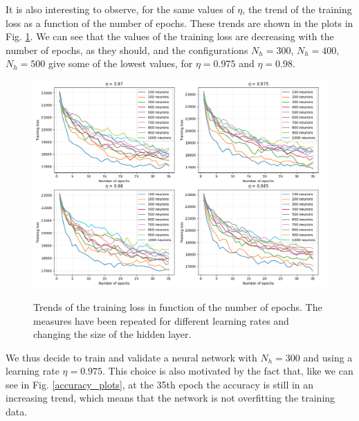 \documentclass[12pt]{article}
\begin{document}
It is also interesting to observe, for the same values of $\eta$, the trend of the training loss as a 
function of the number of epochs. These trends are shown in the plots in Fig. \ref{training_loss}. We
can see that the values of the training loss are decreasing with the number of epochs, as they should, 
and the configurations $N_h = 300$, $N_h = 400$, $N_h = 500$ give some of the lowest values, for 
$\eta = 0.975$ and $\eta = 0.98$.
\begin{figure}
  \centering
  \includegraphics[scale=0.35]{./img/training_loss_plots.png}
  \label{training_loss}
  \caption{Trends of the training loss in function of the number of epochs. The measures have been repeated
  for different learning rates and changing the size of the hidden layer.}
\end{figure}
We thus decide to train and validate a neural network with $N_h = 300$ and using a learning rate 
$\eta = 0.975$. This choice is also motivated by the fact that, like we can see in Fig. \ref{accuracy_plots},
at the 35th epoch the accuracy is still in an increasing trend, which means that the network is not
overfitting the training data. \\
\end{document}
